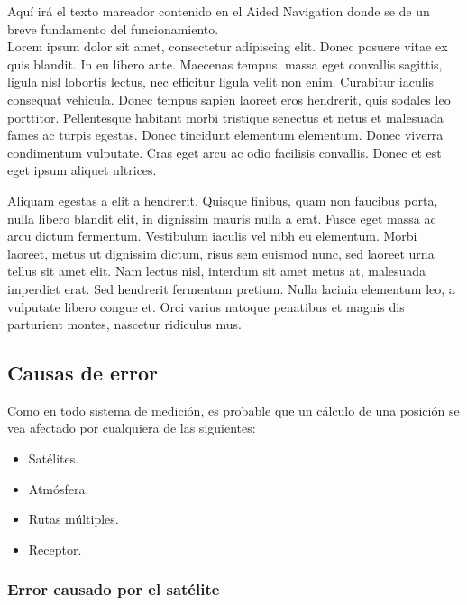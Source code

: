 Aquí irá el texto mareador contenido en el Aided Navigation donde se de un breve fundamento del funcionamiento.\\

Lorem ipsum dolor sit amet, consectetur adipiscing elit. Donec posuere vitae ex quis blandit. In eu libero ante. Maecenas tempus, massa eget convallis sagittis, ligula nisl lobortis lectus, nec efficitur ligula velit non enim. Curabitur iaculis consequat vehicula. Donec tempus sapien laoreet eros hendrerit, quis sodales leo porttitor. Pellentesque habitant morbi tristique senectus et netus et malesuada fames ac turpis egestas. Donec tincidunt elementum elementum. Donec viverra condimentum vulputate. Cras eget arcu ac odio facilisis convallis. Donec et est eget ipsum aliquet ultrices.

Aliquam egestas a elit a hendrerit. Quisque finibus, quam non faucibus porta, nulla libero blandit elit, in dignissim mauris nulla a erat. Fusce eget massa ac arcu dictum fermentum. Vestibulum iaculis vel nibh eu elementum. Morbi laoreet, metus ut dignissim dictum, risus sem euismod nunc, sed laoreet urna tellus sit amet elit. Nam lectus nisl, interdum sit amet metus at, malesuada imperdiet erat. Sed hendrerit fermentum pretium. Nulla lacinia elementum leo, a vulputate libero congue et. Orci varius natoque penatibus et magnis dis parturient montes, nascetur ridiculus mus.

\subsection{Causas de error}

Como en todo sistema de medición, es probable que un cálculo de una posición se vea afectado por cualquiera de las siguientes: 

\begin{itemize}
	\item Satélites.
	\item Atmósfera.
	\item Rutas múltiples.
	\item Receptor.
\end{itemize} 

\subsubsection{Error causado por el satélite}

